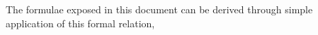 \documentclass[reprint,prd, superscriptaddress, tightenlines, longbibliography, nofootinbib, eqsecnum, amsfonts, amsmath, floatfix, notitlepage, twocolumn]{revtex4-1}
\begin{document}
% 	
The formulae exposed in this document can be derived through simple application of this formal relation,
\end{document}
